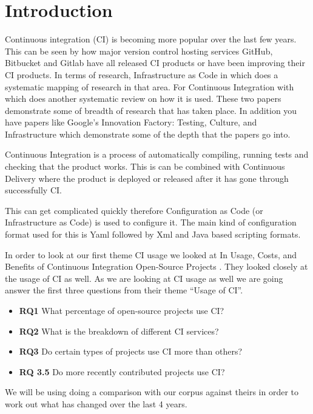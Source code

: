 \documentclass[10pt,conference]{IEEEtran}
\begin{document}
\section{Introduction}
\label{Introduction}

Continuous integration (CI) is becoming more popular over the last few years. This can be seen by how major version control hosting services GitHub, Bitbucket and Gitlab have all released CI products or have been improving their CI products. In terms of research, Infrastructure as Code in \citet{Rahman2019} which does a systematic mapping of research in that area. For Continuous Integration with \citet{Shahin2017} which does another systematic review on how it is used. These two papers demonstrate some of breadth of research that has taken place. In addition you have papers like Google's Innovation Factory: Testing, Culture, and Infrastructure \citet{Copeland2010} which demonstrate some of the depth that the papers go into.

Continuous Integration is a process of automatically compiling, running tests and checking that the product works. This is can be combined with Continuous Delivery where the product is deployed or released after it has gone through successfully CI. 

This can get complicated quickly therefore Configuration as Code (or Infrastructure as Code) is used to configure it. The main kind of configuration format used for this is Yaml followed by Xml and Java based scripting formats.


In order to look at our first theme CI usage we looked at In Usage, Costs, and Benefits of Continuous Integration Open-Source Projects \cite{Hilton2016}. They looked closely at the usage of CI as well. As we are looking at CI usage as well we are going answer the first three questions from their theme \enquote{Usage of CI}. 
\begin{itemize}
  \item \textbf{RQ1} What percentage of open-source projects use CI?
  \item \textbf{RQ2} What is the breakdown of different CI services?
  \item \textbf{RQ3} Do certain types of projects use CI more than others?
  \item \textbf{RQ 3.5} Do more recently contributed projects use CI?
\end{itemize}

We will be using doing a comparison with our corpus against theirs in order to work out what has changed over the last 4 years. 
\end{document}
